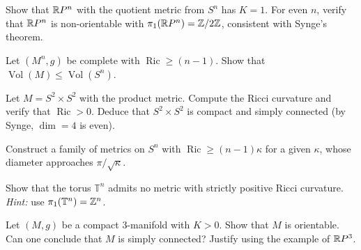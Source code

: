 \begin{exercise}
Show that $\mathbb{R} P^n$ with the quotient metric from $S^n$ has $K = 1$. For even $n$,
verify that $\mathbb{R} P^n$ is non-orientable with $\pi_1(\mathbb{R} P^n) = \mathbb{Z}/2\mathbb{Z}$, consistent
with Synge's theorem.
\end{exercise}

\begin{exercise}
Let $(M^n, g)$ be complete with $\operatorname{Ric} \geq (n-1)$. Show that
$\operatorname{Vol}(M) \leq \operatorname{Vol}(S^n)$.
\end{exercise}

\begin{exercise}
Let $M = S^2 \times S^2$ with the product metric. Compute the Ricci curvature and
verify that $\operatorname{Ric} > 0$. Deduce that $S^2 \times S^2$ is compact and
simply connected (by Synge, $\dim = 4$ is even).
\end{exercise}

\begin{exercise}
Construct a family of metrics on $S^n$ with $\operatorname{Ric} \geq (n-1)\kappa$
for a given $\kappa$, whose diameter approaches $\pi/\sqrt{\kappa}$.
\end{exercise}

\begin{exercise}
Show that the torus $\mathbb{T}^n$ admits no metric with strictly positive Ricci
curvature. \emph{Hint:} use $\pi_1(\mathbb{T}^n) = \mathbb{Z}^n$.
\end{exercise}

\begin{exercise}
Let $(M, g)$ be a compact $3$-manifold with $K > 0$. Show that $M$ is orientable.
Can one conclude that $M$ is simply connected? Justify using the example of $\mathbb{R} P^3$.
\end{exercise}
